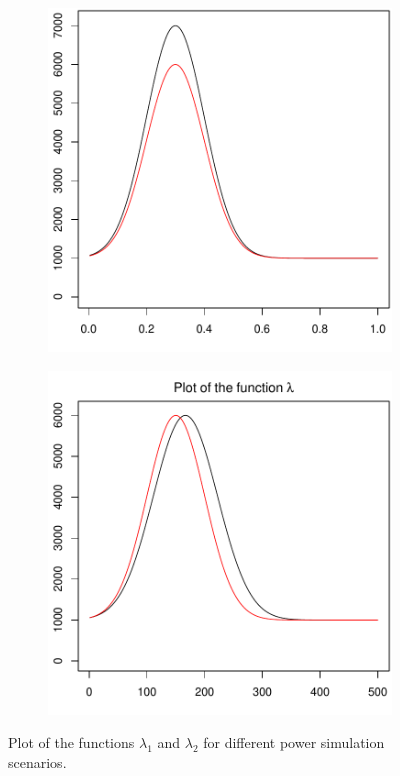 \documentclass[a4paper,12pt]{article}
\numberwithin{equation}{section}
\begin{document}
\begin{figure}[t!]
\centering
\begin{subfigure}[b]{0.475\textwidth}
\includegraphics[width=\textwidth]{plots/lambda_fcts_height}
\caption{}\label{fig:lambda_fcts_height}
\end{subfigure}\hspace{0.25cm}
\begin{subfigure}[b]{0.475\textwidth}
\includegraphics[width=\textwidth]{plots/lambda_fcts_shift}
\caption{}\label{fig:lambda_fcts_shift}
\end{subfigure}
\caption{Plot of the functions $\lambda_1$ and $\lambda_2$ for different power simulation scenarios.}
\end{figure}
\end{document}
